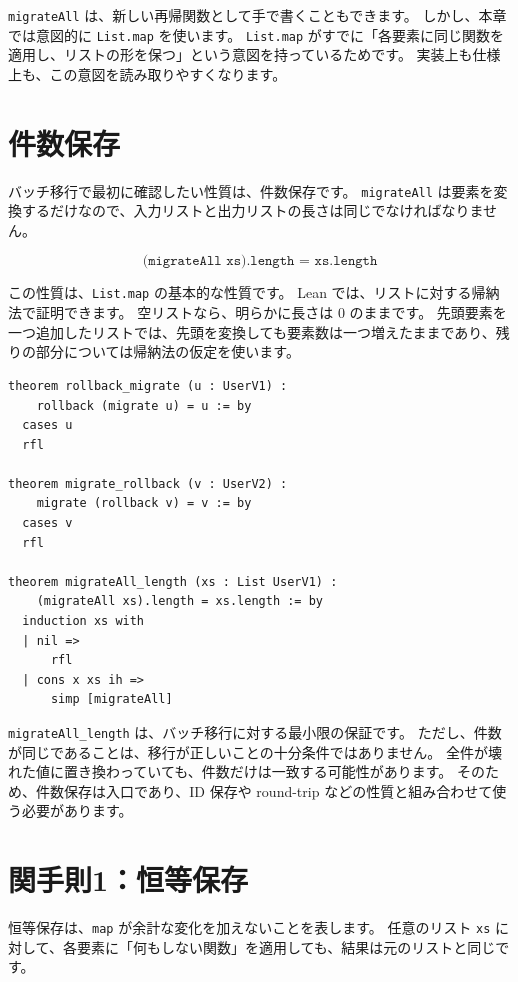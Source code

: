 \texttt{migrateAll} は、新しい再帰関数として手で書くこともできます。
しかし、本章では意図的に \texttt{List.map} を使います。
\texttt{List.map} がすでに「各要素に同じ関数を適用し、リストの形を保つ」という意図を持っているためです。
実装上も仕様上も、この意図を読み取りやすくなります。

\section{件数保存}

バッチ移行で最初に確認したい性質は、件数保存です。
\texttt{migrateAll} は要素を変換するだけなので、入力リストと出力リストの長さは同じでなければなりません。

\[
  \texttt{(migrateAll xs).length = xs.length}
\]

この性質は、\texttt{List.map} の基本的な性質です。
Lean では、リストに対する帰納法で証明できます。
空リストなら、明らかに長さは 0 のままです。
先頭要素を一つ追加したリストでは、先頭を変換しても要素数は一つ増えたままであり、残りの部分については帰納法の仮定を使います。

\begin{listing}[htbp]
\begin{verbatim}
theorem rollback_migrate (u : UserV1) :
    rollback (migrate u) = u := by
  cases u
  rfl

theorem migrate_rollback (v : UserV2) :
    migrate (rollback v) = v := by
  cases v
  rfl

theorem migrateAll_length (xs : List UserV1) :
    (migrateAll xs).length = xs.length := by
  induction xs with
  | nil =>
      rfl
  | cons x xs ih =>
      simp [migrateAll]
\end{verbatim}
\caption{\texttt{migrateAll\_length}}
\label{lst:ch30-length-preservation}
\end{listing}

\texttt{migrateAll\_length} は、バッチ移行に対する最小限の保証です。
ただし、件数が同じであることは、移行が正しいことの十分条件ではありません。
全件が壊れた値に置き換わっていても、件数だけは一致する可能性があります。
そのため、件数保存は入口であり、ID 保存や round-trip などの性質と組み合わせて使う必要があります。

\section{関手則1：恒等保存}

恒等保存は、\texttt{map} が余計な変化を加えないことを表します。
任意のリスト \texttt{xs} に対して、各要素に「何もしない関数」を適用しても、結果は元のリストと同じです。

